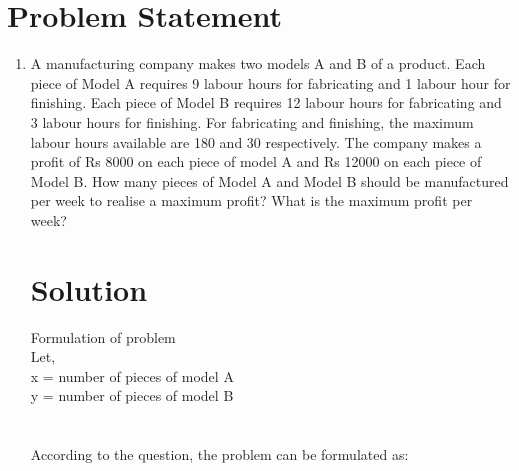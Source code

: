\documentclass[journal,12pt,onecolumn]{IEEEtran}
\begin{document}
\section{Problem Statement}
\begin{enumerate}
 
\item A manufacturing company makes two models A and B of a product. Each piece of Model A requires 9 labour hours for fabricating and 1 labour hour for finishing. Each piece of Model B requires 12 labour hours for fabricating and 3 labour hours for finishing. For fabricating and finishing, the maximum labour hours available are 180 and 30 respectively. The company makes a profit of Rs 8000 on each piece of model A and Rs 12000 on each piece of Model B. How many pieces of Model A and Model B should be manufactured per week to realise a maximum profit? What is the maximum profit per week?
\maketitle
\section{Solution}
Formulation of problem\\

Let,\\ x = number of pieces of model A\\
 y = number of pieces of model B\\
\\\\
According to the question, the problem can be formulated as:
\\\\


\end{enumerate}
\end{document}
